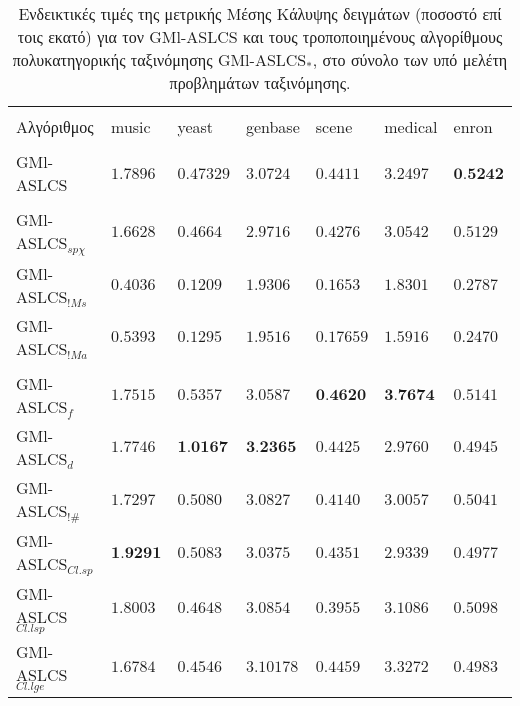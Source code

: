 \begin{table}[!h]
\begin{center}
    \caption{Ενδεικτικές τιμές της μετρικής Μέσης Κάλυψης δειγμάτων (ποσοστό επί τοις εκατό) για τον GMl-ASLCS και τους τροποποιημένους αλγορίθμους πολυκατηγορικής ταξινόμησης GMl-ASLCS$_{*}$, στο σύνολο των υπό μελέτη προβλημάτων ταξινόμησης.}
	\label{table:coverageBasedComparisonVars}
    \begin{tabular}{l|llllll}
        \hline \\ [-2ex] 
    Αλγόριθμος           	& music      	& yeast         & genbase       & scene     & medical       & enron        \\     \hline \\ [-2ex] 
    GMl-ASLCS            	& $1.7896$    	& $0.47329$   	& $3.0724$    	& $0.4411$  & $3.2497$    & $\textbf{0.5242}$          \\ \hline \\ [-2ex]
    GMl-ASLCS$_{sp\chi}$  	& $1.6628$    	& $0.4664$    	& $2.9716$    	& $0.4276$  & $3.0542$    & $0.5129$         \\
    GMl-ASLCS$_{!Ms}$    	& $0.4036$ 		& $0.1209$ 		& $1.9306$ 		& $0.1653$  & $1.8301$    & $0.2787$             \\
    GMl-ASLCS$_{!Ma}$    	& $0.5393$    	& $0.1295$    	& $1.9516$    & $0.17659$ & $1.5916$ & $0.2470$  
\\ \hline \\ [-2ex]
    GMl-ASLCS$_{f}$      	& $1.7515$    & $0.5357$    & $3.0587$    & $\textbf{0.4620}$  & $\textbf{3.7674}$    & $0.5141$           \\
    GMl-ASLCS$_{d}$      	& $1.7746$    & $\textbf{1.0167}$    & $\textbf{3.2365}$    & $0.4425$  & $2.9760$    & $0.4945$             \\
    GMl-ASLCS$_{!\#}$    	& $1.7297$    & $0.5080$    & $3.0827$    & $0.4140$  & $3.0057$    & $0.5041$            \\
    GMl-ASLCS$_{Cl.sp}$  	& $\textbf{1.9291}$    & $0.5083$    & $3.0375$    & $0.4351$		& $2.9339$    & $0.4977$   
\\
    GMl-ASLCS$_{Cl.lsp}$ 	& $1.8003$    & $0.4648$    & $3.0854$    & $0.3955$  & $3.1086$    & $0.5098$             \\
    GMl-ASLCS$_{Cl.lge}$ 	& $1.6784$    & $0.4546$    & $3.10178$   & $0.4459$  & $3.3272$    & $0.4983$    
\\ \hline
    \end{tabular}
    \end{center}
\end{table}


